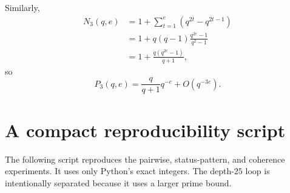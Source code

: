 \documentclass[11pt]{article}
\theoremstyle{definition}
\theoremstyle{remark}
\begin{document}
Similarly,
\[
\begin{aligned}
 N_3(q,e)
 &=1+\sum_{t=1}^e(q^{2t}-q^{2t-1})\\
 &=1+q(q-1)\frac{q^{2e}-1}{q^2-1}\\
 &=1+\frac{q(q^{2e}-1)}{q+1},
\end{aligned}
\]
so
\[
       P_3(q,e)=\frac{q}{q+1}q^{-e}+O(q^{-3e}).
\]

\section{A compact reproducibility script}
\label{app:code}

The following script reproduces the pairwise, status-pattern, and coherence experiments.  It uses
only Python's exact integers.  The depth-$25$ loop is intentionally separated because it uses a
larger prime bound.
\end{document}
